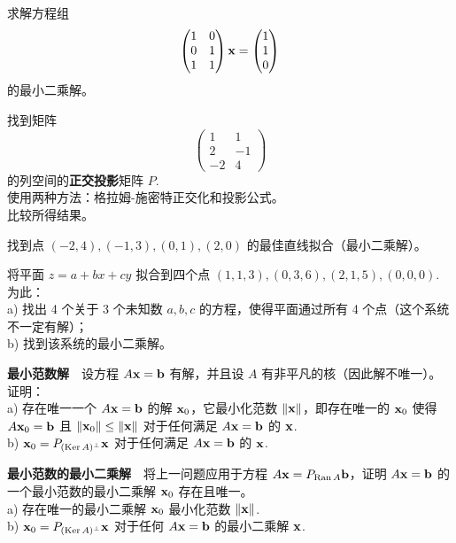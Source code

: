 \begin{problemset}
\item \label{ex:05-04-01} 求解方程组 $$\begin{pmatrix} 1 & 0 \\ 0 & 1 \\ 1 & 1 \end{pmatrix} \mathbf{x} = \begin{pmatrix} 1 \\ 1 \\ 0 \end{pmatrix}$$ 的最小二乘解。
\item \label{ex:05-04-02} 找到矩阵 $$\begin{pmatrix} 1 & 1 \\ 2 & -1 \\ -2 & 4 \end{pmatrix}$$ 的列空间的\textbf{正交投影}矩阵 $P$.~\\
使用两种方法：格拉姆-施密特正交化和投影公式。
\\
比较所得结果。
\item \label{ex:05-04-03} 找到点 $(-2, 4), (-1, 3), (0, 1), (2, 0)$ 的最佳直线拟合（最小二乘解）。
\item \label{ex:05-04-04} 将平面 $z = a + bx + cy$ 拟合到四个点 $(1, 1, 3), (0, 3, 6), (2, 1, 5), (0, 0, 0)$.~
\\
为此：
\\
a) 找出 4 个关于 3 个未知数 $a, b, c$ 的方程，使得平面通过所有 4 个点（这个系统不一定有解）；
\\
b) 找到该系统的最小二乘解。
\item \label{ex:05-04-05} \textbf{最小范数解}~~设方程 $A\mathbf{x} = \mathbf{b}$ 有解，并且设 $A$ 有非平凡的核（因此解不唯一）。证明：
\\
a) 存在唯一一个 $A\mathbf{x} = \mathbf{b}$ 的解 $\mathbf{x}_0$，它最小化范数 $\|\mathbf{x}\|$，即存在唯一的 $\mathbf{x}_0$ 使得 $A\mathbf{x}_0 = \mathbf{b}$ 且 $\|\mathbf{x}_0\| \leq \|\mathbf{x}\|$ 对于任何满足 $A\mathbf{x} = \mathbf{b}$ 的 $\mathbf{x}$.~
\\
b) $\mathbf{x}_0 = P_{(\operatorname{Ker} A)^\perp} \mathbf{x}$ 对于任何满足 $A\mathbf{x} = \mathbf{b}$ 的 $\mathbf{x}$.~
\item \label{ex:05-04-06} \textbf{最小范数的最小二乘解}~~将上一问题应用于方程 $A\mathbf{x} = P_{\operatorname{Ran} A} \mathbf{b}$，证明 $A \mathbf{x} = \mathbf{b}$ 的一个最小范数的最小二乘解 $\mathbf{x}_0$ 存在且唯一。
\\
a) 存在唯一的最小二乘解 $\mathbf{x}_0$ 最小化范数 $\|\mathbf{x}\|$.~
\\
b) $\mathbf{x}_0 = P_{(\operatorname{Ker} A)^\perp} \mathbf{x}$ 对于任何 $A\mathbf{x} = \mathbf{b}$ 的最小二乘解 $\mathbf{x}$.~

\end{problemset}



